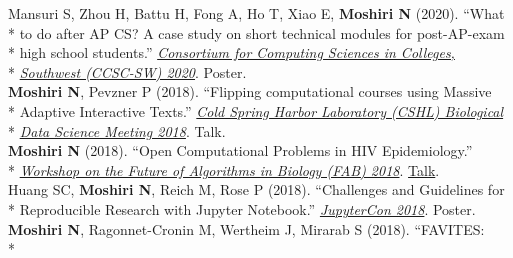\documentclass[margin,line]{res}
\begin{document}
\begin{resume}
\hspace*{4mm} Mansuri S, Zhou H, Battu H, Fong A, Ho T, Xiao E, \textbf{Moshiri N} (2020). ``What\\*
\hspace*{9mm} to do after AP CS? A case study on short technical modules for post-AP-exam\\*
\hspace*{9mm} high school students.'' \href{http://ccsc.org/southwestern/2020/index.php}{\textit{Consortium for Computing Sciences in Colleges,}}\\*\vspace{2mm}
\hspace*{8mm} \href{http://ccsc.org/southwestern/2020/index.php}{\textit{Southwest (CCSC-SW) 2020}}. Poster.\\
\hspace*{4mm} \textbf{Moshiri N}, Pevzner P (2018). ``Flipping computational courses using Massive\\*
\hspace*{9mm} Adaptive Interactive Texts.'' \href{http://meetings.cshl.edu/meetings.aspx?meet=DATA&year=18}{\textit{Cold Spring Harbor Laboratory (CSHL) Biological}}\\*\vspace{2mm}
\hspace*{8mm} \href{http://meetings.cshl.edu/meetings.aspx?meet=DATA&year=18}{\textit{Data Science Meeting 2018}}. Talk.\\
\hspace*{4mm} \textbf{Moshiri N} (2018). ``Open Computational Problems in HIV Epidemiology.''\\*\vspace{2mm}
\hspace*{8mm} \href{http://fab2018.cbd.cmu.edu/}{\textit{Workshop on the Future of Algorithms in Biology (FAB) 2018}}. \href{https://youtu.be/ENKBbV_30kk}{Talk}.\\
\hspace*{4mm} Huang SC, \textbf{Moshiri N}, Reich M, Rose P (2018). ``Challenges and Guidelines for\\*\vspace{2mm}
\hspace*{8mm} Reproducible Research with Jupyter Notebook.'' \href{https://conferences.oreilly.com/jupyter/jup-ny}{\textit{JupyterCon 2018}}. Poster.\\
\hspace*{4mm} \textbf{Moshiri N}, Ragonnet-Cronin M, Wertheim J, Mirarab S (2018). ``FAVITES:\\*

\end{resume}
\end{document}
